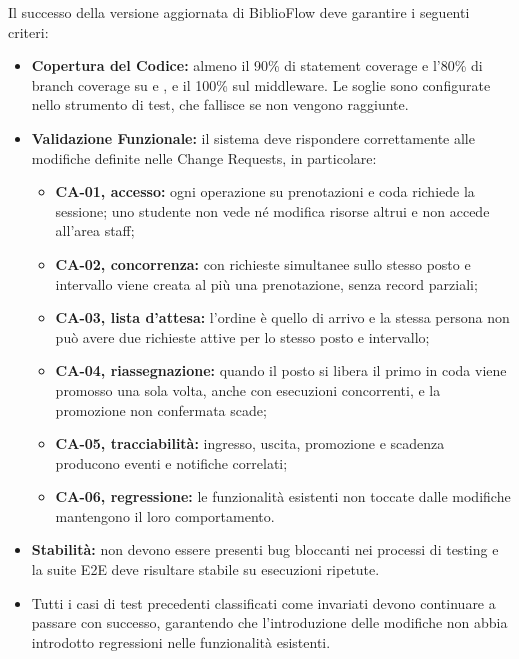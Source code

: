 \documentclass[11pt,a4paper,oneside,openany]{book}
\begin{document}
Il successo della versione aggiornata di BiblioFlow deve garantire i seguenti
criteri:
\begin{itemize}
  \item \textbf{Copertura del Codice:} almeno il 90\% di statement coverage e
        l'80\% di branch coverage su  e , e il
        100\% sul middleware. Le soglie sono configurate nello strumento di
        test, che fallisce se non vengono raggiunte.
  \item \textbf{Validazione Funzionale:} il sistema deve rispondere
        correttamente alle modifiche definite nelle Change Requests, in
        particolare:
  \begin{itemize}
    \item \textbf{CA-01, accesso:} ogni operazione su prenotazioni e coda
          richiede la sessione; uno studente non vede né modifica risorse
          altrui e non accede all'area staff;
    \item \textbf{CA-02, concorrenza:} con richieste simultanee sullo stesso
          posto e intervallo viene creata al più una prenotazione, senza
          record parziali;
    \item \textbf{CA-03, lista d'attesa:} l'ordine è quello di arrivo e la
          stessa persona non può avere due richieste attive per lo stesso
          posto e intervallo;
    \item \textbf{CA-04, riassegnazione:} quando il posto si libera il primo
          in coda viene promosso una sola volta, anche con esecuzioni
          concorrenti, e la promozione non confermata scade;
    \item \textbf{CA-05, tracciabilità:} ingresso, uscita, promozione e
          scadenza producono eventi e notifiche correlati;
    \item \textbf{CA-06, regressione:} le funzionalità esistenti non toccate
          dalle modifiche mantengono il loro comportamento.
  \end{itemize}
  \item \textbf{Stabilità:} non devono essere presenti bug bloccanti nei
        processi di testing e la suite E2E deve risultare stabile su
        esecuzioni ripetute.
  \item Tutti i casi di test precedenti classificati come invariati devono
        continuare a passare con successo, garantendo che l'introduzione delle
        modifiche non abbia introdotto regressioni nelle funzionalità
        esistenti.
\end{itemize}
\end{document}
